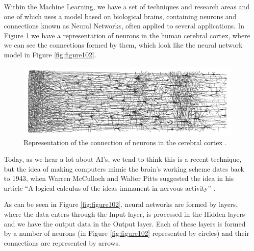 Within the Machine Learning, we have a set of techniques and research areas and one of which uses a model based on biological brains, containing neurons and connections known as Neural Networks, often applied to several applications. In Figure  \ref{fig:figure101} we have a representation of neurons in the human cerebral cortex, where we can see the connections formed by them, which look like the neural network model in Figure \ref{fig:figure102}.

\begin{figure}
    \centering
    \includegraphics[scale=0.30]{figure101.png}
    \caption{Representation of the connection of neurons in the cerebral cortex \cite{cajal}.}
    \label{fig:figure101}
\end{figure}

Today, as we hear a lot about AI's, we tend to think this is a recent technique, but the idea of making computers mimic the brain's working scheme dates back to 1943, when Warren McCulloch and Walter Pitts suggested the idea in his article “A logical calculus of the ideas immanent in nervous activity” \cite{mcculloch1943}.

As can be seen in Figure \ref{fig:figure102}, neural networks are formed by layers, where the data enters through the Input layer, is processed in the Hidden layers and we have the output data in the Output layer. Each of these layers is formed by a number of neurons (in Figure \ref{fig:figure102} represented by circles) and their connections are represented by arrows.

